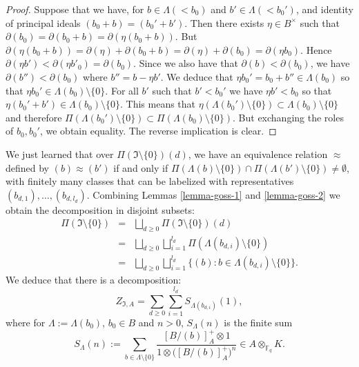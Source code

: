 \documentclass[11pt]{amsart}
\numberwithin{equation}{section}
\newcommand{\FF}{\mathbb{F}}
\begin{document}
\begin{proof}
Suppose that we have, for $b\in\Lambda(<b_0)$ and $b'\in\Lambda(<b_0')$, and identity of principal ideals
$(b_0+b)=(b_0'+b')$. 
Then there exists $\eta\in B^\times$ such that $\partial(b_0)=\partial(b_0+b)=\partial(\eta(b_0+b))$.
But $\partial(\eta(b_0+b))=\partial(\eta)+\partial(b_0+b)=\partial(\eta)+\partial(b_0)=\partial(\eta b_0)$.
Hence $\partial(\eta b')<\partial(\eta b'_0)=\partial(b_0)$. Since we also have that $\partial(b)<\partial(b_0)$,
we have $\partial(b'')<\partial(b_0)$ where $b''=b-\eta b'$. We deduce that $\eta b_0'=b_0+b''\in\Lambda(b_0)$
so that $\eta b_0'\in\Lambda(b_0)\setminus\{0\}$. For all $b'$ such that $b'<b_0'$ we have $\eta b'<b_0$ so that
$\eta (b_0'+b')\in\Lambda(b_0)\setminus\{0\}$. This means that $\eta(\Lambda(b_0')\setminus\{0\})\subset\Lambda(b_0)\setminus\{0\}$ and therefore $\Pi(\Lambda(b_0')\setminus\{0\})\subset\Pi(\Lambda(b_0)\setminus\{0\})$.
But exchanging the roles of $b_0,b_0'$, we obtain equality.
The reverse implication is clear.
\end{proof}

We just learned that over $\Pi(\mathfrak{I}\setminus\{0\})(d)$, we have an equivalence relation $\approx$ defined by $(b)\approx (b')$ if and only if $\Pi(\Lambda(b)\setminus\{0\})\cap\Pi(\Lambda(b')\setminus\{0\})\neq\emptyset$, with finitely many classes that can be labelized with representatives
$(b_{d,1}),\ldots,(b_{d,l_d})$. Combining Lemmas \ref{lemma-goss-1} and \ref{lemma-goss-2} we obtain the decomposition in disjoint subsets:
\begin{eqnarray}
\Pi(\mathfrak{I}\setminus\{0\})&=&\bigsqcup_{d\geq0}\Pi(\mathfrak{I}\setminus\{0\})(d)\nonumber\\
&=&\bigsqcup_{d\geq0}\bigsqcup_{i=1}^{l_d}\Pi(\Lambda(b_{d,i})\setminus\{0\})\nonumber\\
&=&\bigsqcup_{d\geq0}\bigsqcup_{i=1}^{l_d}\{(b):b\in\Lambda(b_{d,i})\setminus\{0\}\}\label{decomposition-bdi}.
\end{eqnarray}
We deduce that there is a decomposition:
\begin{equation}\label{goss-decomposition}
Z_{\mathfrak{I},A}=\sum_{d\geq 0}\sum_{i=1}^{l_d}S_{\Lambda(b_{d,i})}(1),
\end{equation}
where for $\Lambda:=\Lambda(b_0)$, $b_0\in B$ and $n>0$, 
$S_{\Lambda}(n)$ is the finite sum
$$S_{\Lambda}(n):=\sum_{b\in\Lambda\setminus\{0\}}\frac{[B/(b)]^+_A\otimes1}{1\otimes\Big([B/(b)]^+_A\Big)^n}\in A\otimes_{\FF_q} K.$$
\end{document}
